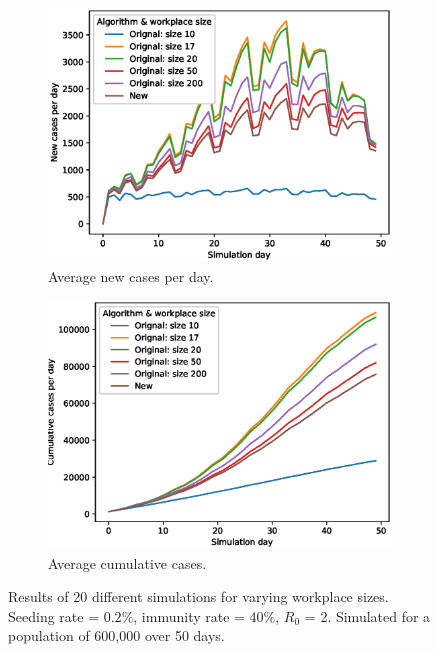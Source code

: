 \documentclass[runningheads]{llncs}
\begin{document}
\begin{figure}[h!]
	\centering
	\begin{subfigure}[b]{0.6\linewidth}
		\includegraphics[width=\linewidth]{Workplace/workplace_sizes_ncpd.eps}
		\caption{Average new cases per day.}
	\end{subfigure}
	\begin{subfigure}[b]{0.6\linewidth}
		\includegraphics[width=\linewidth]{Workplace/workplace_sizes_ccpd.eps}
		\caption{Average cumulative cases.}
	\end{subfigure}
	\caption{Results of 20 different simulations for varying workplace sizes. Seeding rate = $0.2\%$, immunity rate = $40\%$, $R_0$ = 2. Simulated for a population of 600,000 over 50 days.}
	\label{workplace_immunity}
\end{figure}
\end{document}
